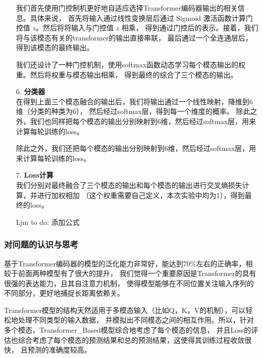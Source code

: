 \documentclass[11pt]{article}
\begin{document}
\begin{enumerate}
                我们首先使用门控制机更好地自适应选择Transformer编码器输出的相关信息。具体来说，
                首先将输入通过线性变换层后通过 Sigmoid 激活函数计算门控值 $z$。然后将将输入与门控值 $z$ 相乘，
                得到通过门控后的表示。接着，我们将与该模态有关的transformer的输出直接串联，
                最后通过一个全连通层后，得到该模态的最终输出。
                
                我们还设计了一种门控机制，使用softmax函数动态学习每个模态输出的权重。然后将权重与模态输出相乘，
                得到最终的综合了三个模态的输出。

                \item [6. ]\textbf{分类器}\\
                在得到上面三个模态融合的输出后，我们将输出通过一个线性映射，降维到6维（分类的种类为6），
                然后经过softmax层，得到每一个维度的概率。
                除此之外，我们也同样把每个模态的输出分别映射到6维，然后经过softmax层，用来计算每轮训练的loss。

                
                除此之外，我们还把每个模态的输出分别映射到6维，然后经过softmax层，用来计算每轮训练的loss。
                
                \item [7. ]\textbf{Loss计算}\\
                我们分别对最终融合了三个模态的输出和每个模态的输出进行交叉熵损失计算，并进行加权相加
                （这个权重需要自己定义，本次实验中均为1），得到最终的loss。
                
                Ljm to do: 添加公式

                
            \end{enumerate}

            \subsubsection{对问题的认识与思考}
            基于Transformer编码器的模型的泛化能力非常好，能达到70\%左右的正确率，相较于前面两种模型有了很大的提升，
            我们觉得一个重要原因是Transformer的具有很强的表达能力，且其自注意力机制，
            使得模型能够在不同位置关注输入序列的不同部分，更好地捕捉长距离依赖关。
            
            Transformer模型的结构天然适用于多模态输入（比如Q，K，V的机制），可以轻松地处理不同类型的输入数据，
            并模拟出不同模态之间的相互作用。所以，针对多个模态，Transformer\_Based模型综合地考虑了每个模态的信息，
            并且Loss的评估也综合考虑了每个模态的预测结果和总的预测结果，这使得其训练过程收敛很快，
            且预测的准确度较高。
            
\end{document}
